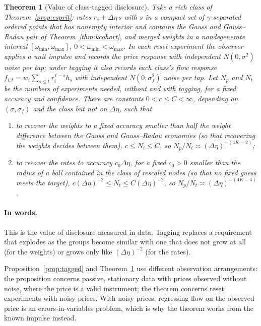 \documentclass[12pt]{article}
\newtheorem{theorem}{Theorem}[section]
\theoremstyle{definition}
\theoremstyle{remark}
\begin{document}
\begin{theorem}[Value of class-tagged disclosure]\label{thm:discvalue}
Take a rich class of Theorem~\ref{prop:esprit}: rates $r_c+\Delta\eta\,s$ with $s$ in a compact set of $\gamma$-separated ordered points that has nonempty interior and contains the Gauss and Gauss--Radau pair of Theorem~\ref{thm:kcohort}, and merged weights in a nondegenerate interval $[\omega_{\min},\omega_{\max}]$, $0<\omega_{\min}<\omega_{\max}$. In each reset experiment the observer applies a unit impulse and records the price response with independent $N(0,\sigma^2)$ noise per tap; under tagging it also records each class's flow response $f_{i,t}=w_i\sum_{s\le t}r_i^{\,t-s}h_s$ with independent $N(0,\sigma_f^2)$ noise per tap. Let $N_p$ and $N_t$ be the numbers of experiments needed, without and with tagging, for a fixed accuracy and confidence. There are constants $0<c\le C<\infty$, depending on $(\sigma,\sigma_f)$ and the class but not on $\Delta\eta$, such that
\begin{enumerate}[label=(\roman*),itemsep=1pt]
\item to recover the weights to a fixed accuracy smaller than half the weight difference between the Gauss and Gauss--Radau economies (so that recovering the weights decides between them), $c\le N_t\le C$, so $N_p/N_t\asymp(\Delta\eta)^{-(4K-2)}$;
\item to recover the rates to accuracy $c_0\Delta\eta$, for a fixed $c_0>0$ smaller than the radius of a ball contained in the class of rescaled nodes (so that no fixed guess meets the target), $c(\Delta\eta)^{-2}\le N_t\le C(\Delta\eta)^{-2}$, so $N_p/N_t\asymp(\Delta\eta)^{-(4K-4)}$.
\end{enumerate}
\end{theorem}
\paragraph{In words.} This is the value of disclosure measured in data. Tagging replaces a requirement that explodes as the groups become similar with one that does not grow at all (for the weights) or grows only like $(\Delta\eta)^{-2}$ (for the rates).


Proposition~\ref{prop:tagged} and Theorem~\ref{thm:discvalue} use different observation arrangements: the proposition concerns passive, stationary data with prices observed without noise, where the price is a valid instrument; the theorem concerns reset experiments with noisy prices. With noisy prices, regressing flow on the observed price is an errors-in-variables problem, which is why the theorem works from the known impulse instead.
\end{document}
